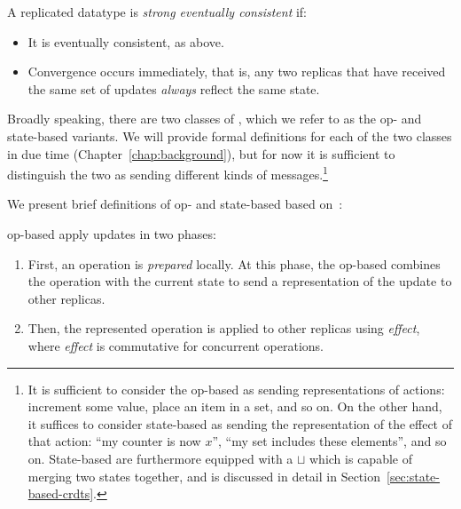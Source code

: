 \begin{definition}
  A replicated datatype is \textit{strong eventually consistent} if:
  \begin{itemize}
    \item It is eventually consistent, as above.
    \item Convergence occurs immediately, that is, any two replicas that have
      received the same set of updates \textit{always} reflect the same state.
  \end{itemize}
\end{definition}

Broadly speaking, there are two classes of \CRDTs, which we refer to as the op-
and state-based variants. We will provide formal definitions for each of the two
classes in due time (Chapter~\ref{chap:background}), but for now it is
sufficient to distinguish the two as sending different kinds of
messages.\footnote{It is sufficient to consider the op-based \CRDT as sending
representations of actions: increment some value, place an item in a set, and so
on. On the other hand, it suffices to consider state-based \CRDTs as sending the
representation of the effect of that action: ``my counter is now $x$'', ``my set
includes these elements'', and so on. State-based \CRDTs are furthermore
equipped with a $\sqcup$ which is capable of merging two states together, and is
discussed in detail in Section~\ref{sec:state-based-crdts}.}

We present brief definitions of op- and state-based \CRDTs based
on~\citep{baquero14}:

\begin{definition}
  op-based \CRDTs apply updates in two phases:
  \begin{enumerate}
    \item First, an operation is \textit{prepared} locally. At this phase, the
      op-based \CRDT combines the operation with the current state to send a
      representation of the update to other replicas.
    \item Then, the represented operation is applied to other replicas using
      \textit{effect}, where \textit{effect} is commutative for concurrent
      operations.
  \end{enumerate}
\end{definition}

